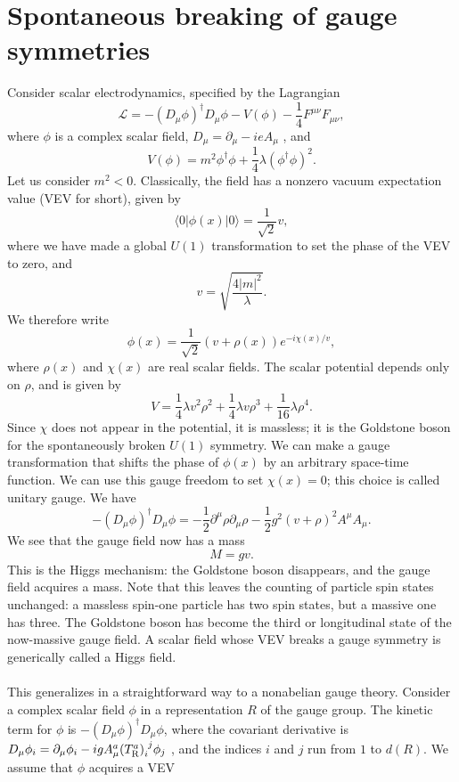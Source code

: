 \section{Spontaneous breaking of gauge symmetries}
Consider scalar electrodynamics, specified by the Lagrangian
\[\mathcal{L} = -(D_{\mu}\phi)^{\dagger}D_{\mu}\phi - V(\phi) - \frac{1}{4}F^{\mu\nu}F_{\mu\nu},\]
where $\phi$ is a complex scalar field, $D_{\mu} = \partial_{\mu} - ieA_{\mu}$ , and
\[V(\phi) = m^2\phi^{\dagger}\phi + \frac{1}{4}\lambda (\phi^{\dagger}\phi)^2.\]
Let us consider $m^2 < 0$. Classically, the field has a nonzero vacuum expectation value (VEV for short), given by
\[\langle 0 | \phi(x) | 0 \rangle = \frac{1}{\sqrt{2}}v,\]
where we have made a global $U(1)$ transformation to set the phase of the VEV to zero, and
\[v = \sqrt{\frac{4|m|^2}{\lambda}}.\]
We therefore write
\[\phi(x) = \frac{1}{\sqrt{2}} (v + \rho(x)) e^{-i\chi(x)/v},\]
where $\rho(x)$ and $\chi(x)$ are real scalar fields. The scalar potential depends only on $\rho$, and is given by
\[V = \frac{1}{4}\lambda v^2\rho^2 + \frac{1}{4}\lambda v \rho^3 + \frac{1}{16}\lambda \rho^4.\]
Since $\chi$ does not appear in the potential, it is massless; it is the Goldstone boson for the spontaneously broken $U(1)$ symmetry.
We can make a gauge transformation that shifts the phase of $\phi(x)$ by an arbitrary space-time function.
We can use this gauge freedom to set $\chi(x) = 0$; this choice is called unitary gauge.
We have
\[-(D_{\mu}\phi)^{\dagger}D_{\mu}\phi = -\frac{1}{2}\partial^{\mu}\rho \partial_{\mu}\rho - \frac{1}{2}g^2(v+\rho)^2 A^{\mu}A_{\mu}.\]
We see that the gauge field now has a mass
\[M = gv.\]
This is the Higgs mechanism: the Goldstone boson disappears, and the gauge field acquires a mass. Note that this leaves the counting of particle spin states unchanged: a massless spin-one particle has two spin states, but a massive
one has three. The Goldstone boson has become the third or longitudinal state of the now-massive gauge field. A scalar field whose VEV breaks a gauge symmetry is generically called a Higgs field.
\\ \\
This generalizes in a straightforward way to a nonabelian gauge theory. Consider a complex scalar field $\phi$ in a representation $R$ of the gauge group.
The kinetic term for $\phi$ is $-(D_{\mu}\phi)^{\dagger}D_{\mu}\phi$, where the covariant derivative is $D_{\mu}\phi_i = \partial_{\mu}\phi_i - igA^a_{\mu}(T^a_{\rm R})_{i}^{\phantom{i}j} \phi_j$ , and the indices $i$ and $j$ run from $1$ to $d(R)$.
We assume that $\phi$ acquires a VEV

